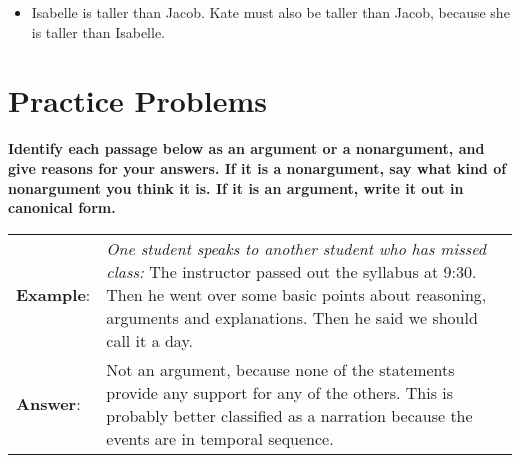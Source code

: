 \begin{itemize}
\item Isabelle is taller than Jacob. Kate must also be taller than Jacob, because she is taller than Isabelle. %


\end{itemize}




\section{Practice Problems}

\textbf{Identify each passage below as an argument or a nonargument, and give reasons for your answers. If it is a nonargument, say what kind of nonargument you think it is. If it is an argument, write it out in canonical form.}

\begin{longtabu} to \textwidth {X[1.2,p]X[10,p]}
\textbf{Example}: & \textit{One student speaks to another student who has missed class:} The instructor passed out the syllabus at 9:30. Then he went over some basic points about reasoning, arguments and explanations. Then he said we should call it a day. \\
\textbf{Answer}: & Not an argument, because none of the statements provide any support for any of the others. This is probably better classified as a narration because the events are in temporal sequence. \\
\end{longtabu}


